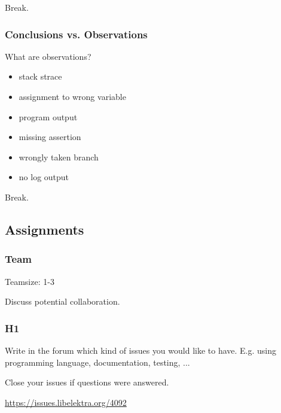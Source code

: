 

\begin{assignment}
	\begin{task}
	Break.
	\end{task}
\end{assignment}



\begin{frame}
	\frametitle{Conclusions vs. Observations}

	What are observations?

	\begin{itemize}[<+-| alert@+>]
		\item stack strace
		\item assignment to wrong variable
		\item program output
		\item missing assertion
		\item wrongly taken branch
		\item no log output
	\end{itemize}
\end{frame}

\begin{assignment}
	\begin{task}
	Break.
	\end{task}
\end{assignment}

\subsection{Assignments}

\begin{assignment}
	\frametitle{Team}
	Teamsize: 1-3

	\begin{task}
	Discuss potential collaboration.
	\end{task}
\end{assignment}

\begin{assignment}
	\frametitle{H1}

	\begin{task}
	Write in the forum which kind of issues you would like to have.
	E.g. using programming language, documentation, testing, ...
	\end{task}

	\begin{task}
	Close your issues if questions were answered.
	\end{task}

	\url{https://issues.libelektra.org/4092}
\end{assignment}

